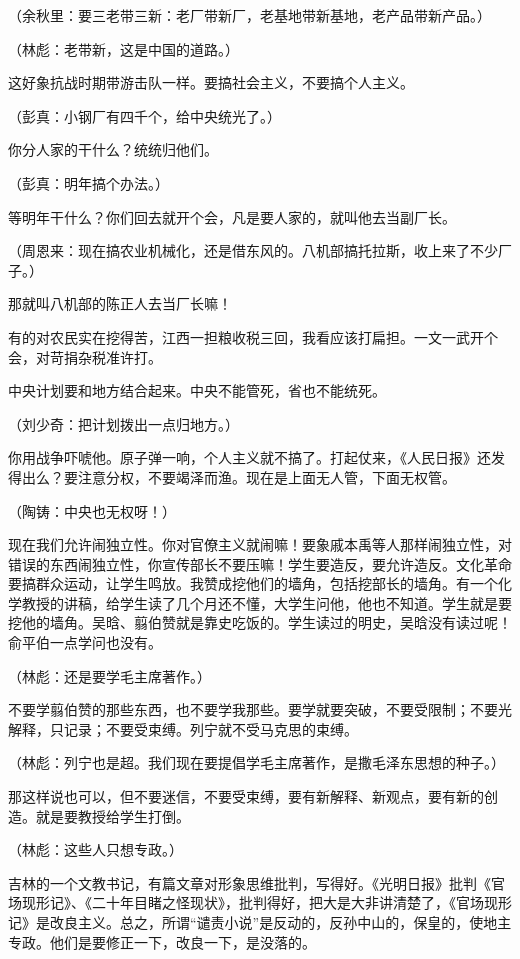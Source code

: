 （余秋里：要三老带三新：老厂带新厂，老基地带新基地，老产品带新产品。）

（林彪：老带新，这是中国的道路。）

这好象抗战时期带游击队一样。要搞社会主义，不要搞个人主义。

（彭真：小钢厂有四千个，给中央统光了。）

你分人家的干什么？统统归他们。

（彭真：明年搞个办法。）

等明年干什么？你们回去就开个会，凡是要人家的，就叫他去当副厂长。

（周恩来：现在搞农业机械化，还是借东风的。八机部搞托拉斯，收上来了不少厂子。）

那就叫八机部的陈正人去当厂长嘛！

有的对农民实在挖得苦，江西一担粮收税三回，我看应该打扁担。一文一武开个会，对苛捐杂税准许打。

中央计划要和地方结合起来。中央不能管死，省也不能统死。

（刘少奇：把计划拨出一点归地方。）

你用战争吓唬他。原子弹一响，个人主义就不搞了。打起仗来，《人民日报》还发得出么？要注意分权，不要竭泽而渔。现在是上面无人管，下面无权管。

（陶铸：中央也无权呀！）

现在我们允许闹独立性。你对官僚主义就闹嘛！要象戚本禹等人那样闹独立性，对错误的东西闹独立性，你宣传部长不要压嘛！学生要造反，要允许造反。文化革命要搞群众运动，让学生鸣放。我赞成挖他们的墙角，包括挖部长的墙角。有一个化学教授的讲稿，给学生读了几个月还不懂，大学生问他，他也不知道。学生就是要挖他的墙角。吴晗、翦伯赞就是靠史吃饭的。学生读过的明史，吴晗没有读过呢！俞平伯一点学问也没有。

（林彪：还是要学毛主席著作。）

不要学翦伯赞的那些东西，也不要学我那些。要学就要突破，不要受限制；不要光解释，只记录；不要受束缚。列宁就不受马克思的束缚。

（林彪：列宁也是超。我们现在要提倡学毛主席著作，是撒毛泽东思想的种子。）

那这样说也可以，但不要迷信，不要受束缚，要有新解释、新观点，要有新的创造。就是要教授给学生打倒。

（林彪：这些人只想专政。）

吉林的一个文教书记，有篇文章对形象思维批判，写得好。《光明日报》批判《官场现形记》、《二十年目睹之怪现状》，批判得好，把大是大非讲清楚了，《官场现形记》是改良主义。总之，所谓“谴责小说”是反动的，反孙中山的，保皇的，使地主专政。他们是要修正一下，改良一下，是没落的。

